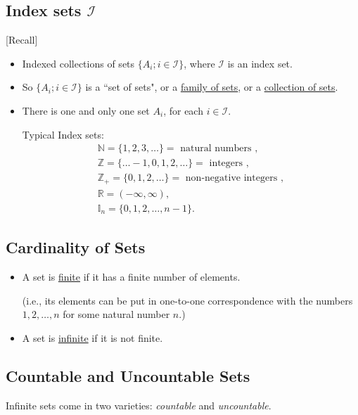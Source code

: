 \documentclass[12pt,thmsa]{article}
\begin{document}
\subsection{Index sets \(\mathcal{I}\)} %
[Recall]
\begin{itemize}
	\item   Indexed collections of sets \( \{A_{i} ; i \in \mathcal{I}\} \), where \(\mathcal{I} \) is an index set.
	\item   So \( \{A_{i} ; i \in \mathcal{I}\} \) is a ``set of sets", or a \underline{family of sets}, or a \underline{collection of sets}.
	\item  There is one and only one set \( A_{i} \), for each \( i \in \mathcal{I} \).

	Typical Index sets:
	\[\begin{array}{l} 
		\mathbb{N}=\{1,2,3, \ldots\}=\text { natural numbers }, \\ 
		\mathbb{Z}=\{\ldots-1,0,1,2, \ldots\}=\text { integers }, \\ 
		\mathbb{Z}_{+}=\{0,1,2, \ldots\}=\text { non-negative integers }, \\
		\mathbb{R}=(-\infty, \infty), \\
		\mathbb{I}_{n}=\{0,1,2, \ldots, n-1\}.
	\end{array}\]
\end{itemize}

\subsection{Cardinality of Sets} %

\begin{itemize}
	\item A set is \underline{finite} if it has a finite number of elements.
	
	(i.e., its elements can be put in one-to-one correspondence with the numbers $1, 2, \ldots, n$ for some natural number $n$.)
	
	\item A set is \underline{infinite} if it is not finite.
\end{itemize}

\subsection{Countable and Uncountable Sets} %
Infinite sets come in two varieties: \textit{countable} and \textit{uncountable}.
\end{document}
